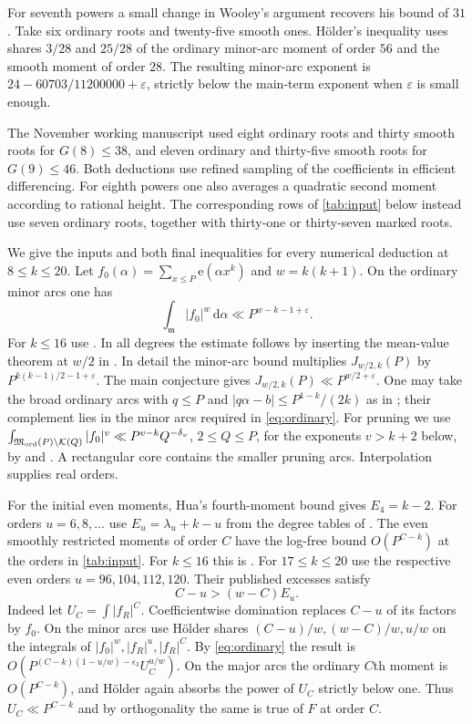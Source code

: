 \documentclass[11pt,letterpaper]{article}
\theoremstyle{definition}
\newcommand{\M}{\mathfrak M}
\newcommand{\m}{\mathfrak m}
\newcommand{\e}{\mathrm e}
\newcommand{\dd}{\,\mathrm d}
\newcommand{\eps}{\varepsilon}
\begin{document}
For seventh powers a small change in Wooley's argument \cite{W16}
recovers his bound of $31$. Take six ordinary roots and twenty-five
smooth ones. H\"older's inequality uses shares $3/28$ and $25/28$
of the ordinary minor-arc moment of order $56$ and the smooth moment
of order $28$. The resulting minor-arc exponent is
$24-60703/11200000+\varepsilon$, strictly below the main-term exponent
when $\varepsilon$ is small enough.

The November working manuscript used eight ordinary roots and thirty
smooth roots for $G(8)\le38$, and eleven ordinary and thirty-five
smooth roots for $G(9)\le46$. Both deductions use refined sampling of
the coefficients in efficient differencing. For eighth powers one also
averages a quadratic second moment according to rational height.
The corresponding rows of \cref{tab:input} below instead use seven
ordinary roots, together with thirty-one or thirty-seven marked roots.

We give the inputs and both final inequalities for every numerical
deduction at $8\le k\le20$. Let
$f_0(\alpha)=\sum_{x\le P}\e(\alpha x^k)$ and $w=k(k+1)$.
On the ordinary minor arcs one has
\begin{equation}\label{eq:ordinary}
 \int_{\m}|f_0|^w\dd\alpha\ll P^{w-k-1+\eps}.
\end{equation}
For $k\le16$ use \cite[Lemma 3.1]{W16}. In all degrees the estimate
follows by inserting the mean-value theorem at $w/2$ in
\cite[Theorem 2.1, with corrigendum]{W12}. In detail the minor-arc
bound multiplies $J_{w/2,k}(P)$ by
$P^{k(k-1)/2-1+\eps}$. The main conjecture gives
$J_{w/2,k}(P)\ll P^{w/2+\eps}$. One may take the broad ordinary arcs
with $q\le P$ and $|q\alpha-b|\le P^{1-k}/(2k)$ as in
\cite{V89,W16}; their complement lies in the minor arcs required
in \eqref{eq:ordinary}. For pruning we use
$\int_{\M_{\rm ord}(P)\setminus\mathcal K(Q)}|f_0|^v
\ll P^{v-k} Q^{-\delta_v}$, $2\le Q\le P$, for the exponents $v>k+2$
below, by \cite[Lemma 5.1]{V89} and \cite[(4.1)]{W16}. A rectangular
core contains the smaller pruning arcs. Interpolation supplies real orders.

For the initial even moments, Hua's fourth-moment bound gives
$E_4=k-2$. For orders $u=6,8,\ldots$ use
$E_u=\lambda_u+k-u$ from the degree tables of \cite[\S\S10--22]{VW00}.
The even smoothly restricted moments of order $C$ have the log-free
bound $O(P^{C-k})$ at the orders in \cref{tab:input}. For $k\le16$
this is \cite[Table 2 and (4.2)]{W16}. For $17\le k\le20$ use the
respective even orders $u=96,104,112,120$. Their published excesses
satisfy
\[
 C-u>(w-C)E_u .
\]
Indeed let $U_C=\int|f_R|^C$. Coefficientwise domination replaces
$C-u$ of its factors by $f_0$. On the minor arcs use H\"older shares
$(C-u)/w,(w-C)/w,u/w$ on the integrals of
$|f_0|^w,|f_R|^u,|f_R|^C$. By \eqref{eq:ordinary} the result is
$O(P^{(C-k)(1-u/w)-\epsilon_3}U_C^{u/w})$. On the major arcs
the ordinary $C$th moment is $O(P^{C-k})$, and H\"older again absorbs
the power of $U_C$ strictly below one. Thus $U_C\ll P^{C-k}$
and by orthogonality the same is true of $F$ at order $C$.
\end{document}
